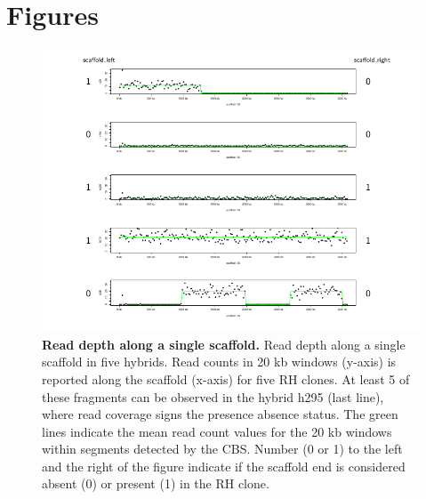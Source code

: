 \documentclass[10pt,letterpaper]{article}
\DeclareRobustCommand{\csentence}[1]{
    {\mathversion{bold}\bfseries #1}}
\begin{document}
\section*{Figures}
  \begin{figure}[h!]
  \includegraphics[scale=0.8]{figure1_readcounts_calling.pdf}
  \caption{\csentence{Read depth along a single scaffold.}
 Read depth along a single scaffold in five hybrids. Read counts in 20 kb windows (y-axis) is reported along the scaffold (x-axis) for five RH clones. At least 5 of these fragments can be observed in the hybrid h295 (last line), where read coverage signs the presence absence status. The green lines indicate the mean read count values for the 20 kb windows within segments detected by the CBS. Number (0 or 1) to the left and the right of the figure indicate if the scaffold end is considered absent (0) or present (1) in the RH clone.}
\label{fig1}
\end{figure}
\end{document}
